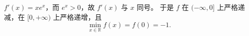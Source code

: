 $f'(x)=xe^x$，而 $e^x>0$，故 $f'(x)$ 与 $x$ 同号。
于是 $f$ 在 $(-\infty,0]$ 上严格递减，在 $[0,+\infty)$ 上严格递增，且
\[
\boxed{\min_{x\in\mathbb R}f(x)=f(0)=-1.}
\]
